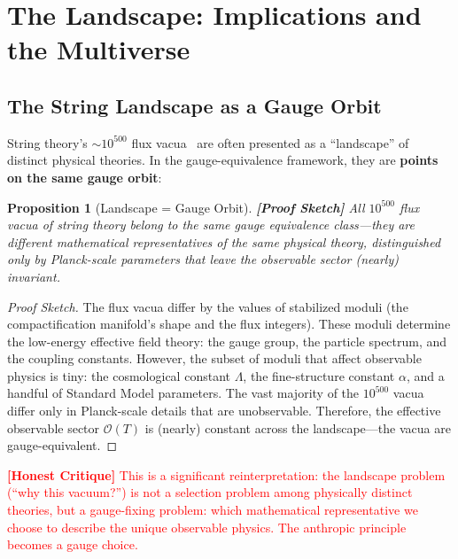 \documentclass[12pt,a4paper]{article}
\newtheorem{proposition}[theorem]{Proposition}
\theoremstyle{remark}
\newcommand{\Obs}{\mathcal{O}}
\newcommand{\rigorSketch}{\textbf{[Proof Sketch]}}
\newcommand{\honestcrit}[1]{\textcolor{red}{\textbf{[Honest Critique]} #1}}
\begin{document}
\section{The Landscape: Implications and the Multiverse}
\label{sec:landscape}

\subsection{The String Landscape as a Gauge Orbit}

String theory's $\sim 10^{500}$ flux vacua~\cite{bousso2007landscape} are often presented as a ``landscape'' of distinct physical theories. In the gauge-equivalence framework, they are \textbf{points on the same gauge orbit}:

\begin{proposition}[Landscape = Gauge Orbit]
\label{prop:landscape_gauge}
\rigorSketch
All $10^{500}$ flux vacua of string theory belong to the same gauge equivalence class---they are different mathematical representatives of the same physical theory, distinguished only by Planck-scale parameters that leave the observable sector (nearly) invariant.
\end{proposition}

\begin{proof}[Proof Sketch]
The flux vacua differ by the values of stabilized moduli (the compactification manifold's shape and the flux integers). These moduli determine the low-energy effective field theory: the gauge group, the particle spectrum, and the coupling constants. However, the subset of moduli that affect observable physics is tiny: the cosmological constant $\Lambda$, the fine-structure constant $\alpha$, and a handful of Standard Model parameters. The vast majority of the $10^{500}$ vacua differ only in Planck-scale details that are unobservable. Therefore, the effective observable sector $\Obs(T)$ is (nearly) constant across the landscape---the vacua are gauge-equivalent.
\end{proof}

\honestcrit{This is a significant reinterpretation: the landscape problem (``why this vacuum?'') is not a selection problem among physically distinct theories, but a gauge-fixing problem: which mathematical representative we choose to describe the unique observable physics. The anthropic principle becomes a gauge choice.}
\end{document}
